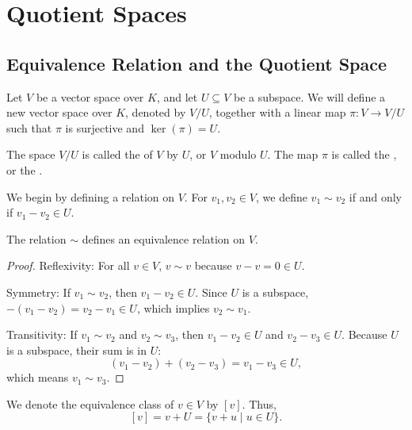 \setcounter{section}{2}
\section{Quotient Spaces}

\subsection{Equivalence Relation and the Quotient Space}
Let $V$ be a vector space over $K$, and let $U \subseteq V$ be a subspace. We will define a new vector space over $K$, denoted by $V/U$, together with a linear map $\pi \colon V \to V/U$ such that $\pi$ is surjective and $\ker(\pi) = U$.

\begin{definition*} The space $V/U$ is called the  of $V$ by $U$, or $V$ modulo $U$. The map $\pi$ is called the , or the .
\end{definition*}

We begin by defining a relation on $V$. For $v_1, v_2 \in V$, we define $v_1 \sim v_2$ if and only if $v_1 - v_2 \in U$.

\begin{lemma*}
  The relation $\sim$ defines an equivalence relation on $V$.
\end{lemma*}

\begin{proof}
  Reflexivity: For all $v \in V$, $v \sim v$ because $v - v = 0 \in U$.

  Symmetry: If $v_1 \sim v_2$, then $v_1 - v_2 \in U$. Since $U$ is a subspace, $-(v_1 - v_2) = v_2 - v_1 \in U$, which implies $v_2 \sim v_1$.

  Transitivity: If $v_1 \sim v_2$ and $v_2 \sim v_3$, then $v_1 - v_2 \in U$ and $v_2 - v_3 \in U$. Because $U$ is a subspace, their sum is in $U$:
  \[ (v_1 - v_2) + (v_2 - v_3) = v_1 - v_3 \in U, \]
  which means $v_1 \sim v_3$.
\end{proof}

We denote the equivalence class of $v \in V$ by $[v]$. Thus,
\[ [v] = v + U = \{v + u \mid u \in U\}. \]

